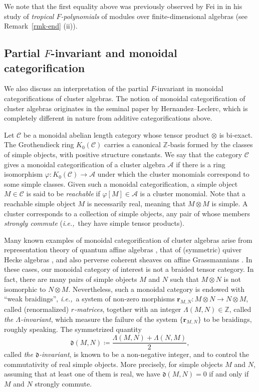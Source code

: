 \documentclass[12pt]{amsart}
\theoremstyle{definition}
\theoremstyle{remark}
\numberwithin{equation}{section}
\newcommand{\ie}{\textit{i.e.,}\ }
\begin{document}
    We note that the first equality above was previously observed by Fei in  \cite[Theorem~3.22]{fei_2019b} in his study of \emph{tropical $F$-polynomials} of modules over finite-dimensional algebras (see Remark~\ref{rmk-end} (ii)). 


  


\subsection{Partial $F$-invariant and monoidal categorification}
We also discuss an interpretation of the partial $F$-invariant in monoidal categorifications of cluster algebras.
The notion of monoidal categorification of cluster algebras originates in the seminal paper \cite{HL_2010} by Hernandez--Leclerc, which is completely different in nature from additive categorifications above.

Let $\mathcal{C}$ be a monoidal abelian length category whose tensor product $\otimes$ is bi-exact. The Grothendieck ring $K_0(\mathcal{C})$ carries a canonical $\mathbb{Z}$-basis formed by the classes of simple objects, with positive structure constants.
We say that the category $\mathcal{C}$ gives a monoidal categorification of a cluster algebra $\mathcal{A}$ if there is a ring isomorphism $\varphi \colon K_0(\mathcal{C}) \to \mathcal{A}$ under which the cluster monomials correspond to some simple classes. 
Given such a monoidal categorification, a simple object $M \in \mathcal{C}$ is said to be {\em reachable} if $\varphi[M] \in \mathcal{A}$ is a cluster monomial.
Note that a reachable simple object $M$ is necessarily real, meaning that $M \otimes M$ is simple.  
A cluster corresponds to a collection of simple objects, any pair of whose members \emph{strongly commute} (\ie they have simple tensor products). 

Many known examples of monoidal categorification of cluster algebras arise from representation theory of quantum affine algebras \cite{HL_2010, Nak_cl, HL_2013, KQ14, HL16, Qin_2017, BC_cl, kkop-2020, kkop-2024}, that of (symmetric) quiver Hecke algebras \cite{kkko-2018}, and also perverse coherent sheaves on affine Grassmannians \cite{CW19}. 
In these cases, our monoidal category of interest is not a braided tensor category.
In fact, there are many pairs of simple objects $M$ and $N$ such that $M \otimes N$ is not isomorphic to $N \otimes M$. 
Nevertheless, such a monoidal category is endowed with ``weak braidings'', \ie a system of non-zero morphisms $\mathbf{r}_{M,N} \colon M \otimes N \to N \otimes M$, called  (renormalized) {\em $r$-matrices}, together with an integer $\Lambda(M,N) \in \mathbb{Z}$, called \emph{the $\Lambda$-invariant}, which measure the failure of the system $\{ \mathbf{r}_{M,N}\}$ to be braidings, roughly speaking.
The symmetrized quantity
\[ \mathfrak{d}(M,N) \coloneqq \frac{\Lambda(M,N) + \Lambda(N,M)}{2}, \]
called \emph{the $\mathfrak{d}$-invariant}, is known to be a non-negative integer, and to control the commutativity of real simple objects. 
More precisely, for simple objects $M$ and $N$, assuming that at least one of them is real, we have $\mathfrak{d}(M,N)=0$ if and only if $M$ and $N$ strongly commute.
\end{document}
